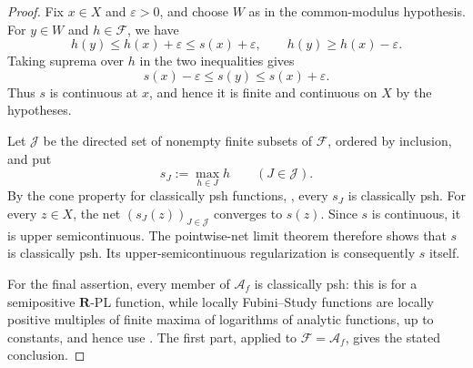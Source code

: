\begin{proof}
Fix $x\in X$ and $\varepsilon>0$, and choose $W$ as in the common-modulus
hypothesis.  For $y\in W$ and $h\in\mathcal F$, we have
\[
 h(y)\leq h(x)+\varepsilon\leq s(x)+\varepsilon,
 \qquad
 h(y)\geq h(x)-\varepsilon.
\]
Taking suprema over $h$ in the two inequalities gives
\[
 s(x)-\varepsilon\leq s(y)\leq s(x)+\varepsilon.
\]
Thus $s$ is continuous at $x$, and hence it is finite and continuous on
$X$ by the hypotheses.

Let $\mathcal J$ be the directed set of nonempty finite subsets of
$\mathcal F$, ordered by inclusion, and put
\[
 s_J:=\max_{h\in J}h\qquad(J\in\mathcal J).
\]
By the cone property for classically psh functions,
\cite[Proposition~4.2(3)]{GR25Classical}, every $s_J$ is classically psh.
For every $z\in X$, the net $(s_J(z))_{J\in\mathcal J}$ converges to
$s(z)$.  Since $s$ is continuous, it is upper semicontinuous.  The
pointwise-net limit theorem \cite[Theorem~6.5]{GR25Classical} therefore
shows that $s$ is classically psh.  Its upper-semicontinuous regularization
is consequently $s$ itself.

For the final assertion, every member of $\mathcal A_f$ is classically psh:
this is \cite[Theorem~4.3]{GR25Classical} for a semipositive
$\mathbf R$-PL function, while locally Fubini--Study functions are locally
positive multiples of finite maxima of logarithms of analytic functions, up
to constants, and hence use \cite[Proposition~4.2(1)--(3)]{GR25Classical}.
The first part, applied to $\mathcal F=\mathcal A_f$, gives the stated
conclusion.
\end{proof}
